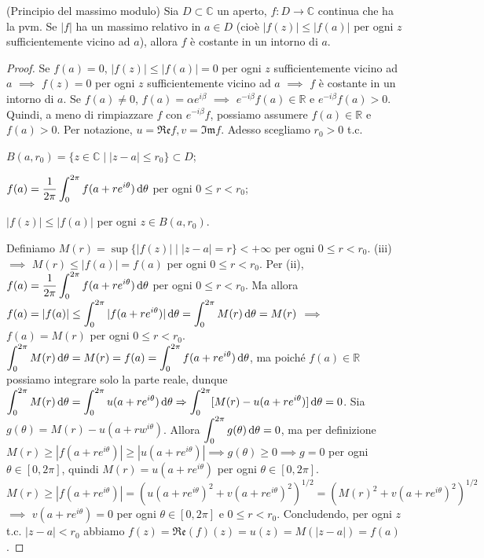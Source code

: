 \begin{thm}
  (Principio del massimo modulo) Sia $D \subset \mathbb{C}$ un aperto, $f:D \longrightarrow \mathbb{C}$ continua che ha la pvm. Se $|f|$ ha un massimo relativo in $a \in D$ (cioè $|f(z)| \le |f(a)|$ per ogni $z$ sufficientemente vicino ad $a$), allora $f$ è costante in un intorno di $a$.
\end{thm}

\begin{proof}
  Se $f(a)=0$, $|f(z)| \le |f(a)|=0$ per ogni $z$ sufficientemente vicino ad $a$ $\implies$ $f(z)=0$ per ogni $z$ sufficientemente vicino ad $a$ $\implies$ $f$ è costante in un intorno di $a$.
  Se $f(a)\not=0$, $f(a)=\alpha e^{i\beta}$ $\implies$ $e^{-i\beta}f(a) \in \mathbb{R}$ e $e^{-i\beta}f(a)>0$. Quindi, a meno di rimpiazzare $f$ con $e^{-i\beta}f$, possiamo assumere $f(a) \in \mathbb{R}$ e $f(a)>0$.
  Per notazione, $u=\mathfrak{Re}f, v=\mathfrak{Im}f$. Adesso scegliamo $r_0>0$ t.c.
  \begin{nlist}
    \item $B(a,r_0)=\{z \in \mathbb{C} \mid |z-a| \le r_0\} \subset D$;
    \item $\displaystyle f(a)=\frac{1}{2\pi} \int_0^{2\pi} f(a+re^{i\theta})\mathop{}\!\mathrm{d}\theta$ per ogni $0 \le r <r_0$;
    \item $|f(z)| \le |f(a)|$ per ogni $z \in B(a,r_0)$.
  \end{nlist}
  Definiamo $M(r)=\sup\{|f(z)| \mid |z-a|=r\}<+\infty$ per ogni $0 \le r<r_0$. (iii) $\implies$ $M(r) \le |f(a)|=f(a)$ per ogni $0 \le r<r_0$. Per (ii), $\displaystyle f(a)=\frac{1}{2\pi} \int_0^{2\pi} f(a+re^{i\theta})\mathop{}\!\mathrm{d}\theta$ per ogni $0 \le r <r_0$.
  Ma allora $\displaystyle f(a)=|f(a)| \le \int_0^{2\pi} |f(a+re^{i\theta})|\mathop{}\!\mathrm{d}\theta=\int_0^{2\pi} M(r)\mathop{}\!\mathrm{d}\theta=M(r)$ $\implies$ $f(a)=M(r)$ per ogni $0 \le r<r_0$.
  $\displaystyle \int_0^{2\pi} M(r)\mathop{}\!\mathrm{d}\theta=M(r)=f(a)=\int_0^{2\pi} f(a+re^{i\theta})\mathop{}\!\mathrm{d}\theta$, ma poiché $f(a) \in \mathbb{R}$ possiamo integrare solo la parte reale, dunque $\displaystyle \int_0^{2\pi} M(r)\mathop{}\!\mathrm{d}\theta=\int_0^{2\pi} u(a+re^{i\theta})\mathop{}\!\mathrm{d}\theta \Rightarrow \int_0^{2\pi} [M(r)-u(a+re^{i\theta})]\mathop{}\!\mathrm{d}\theta=0$.
  Sia $g(\theta)=M(r)-u(a+rw^{i\theta})$. Allora $\displaystyle \int_0^{2\pi} g(\theta)\mathop{}\!\mathrm{d}\theta=0$, ma per definizione $M(r) \ge |f(a+re^{i\theta})|\ge |u(a+re^{i\theta})| \implies g(\theta) \ge 0 \implies g=0$ per ogni $\theta \in [0,2\pi]$, quindi $M(r)=u(a+re^{i\theta})$ per ogni $\theta \in [0,2\pi]$.
  $M(r) \ge |f(a+re^{i\theta})|=(u(a+re^{i\theta})^2+v(a+re^{i\theta})^2)^{1/2}=(M(r)^2+v(a+re^{i\theta})^2)^{1/2}$ $\implies$ $v(a+re^{i\theta})=0$ per ogni $\theta \in [0, 2\pi]$ e $0 \le r<r_0$. Concludendo, per ogni $z$ t.c. $|z-a|<r_0$ abbiamo $f(z)=\mathfrak{Re}(f)(z)=u(z)=M(|z-a|)=f(a)$.
\end{proof}

